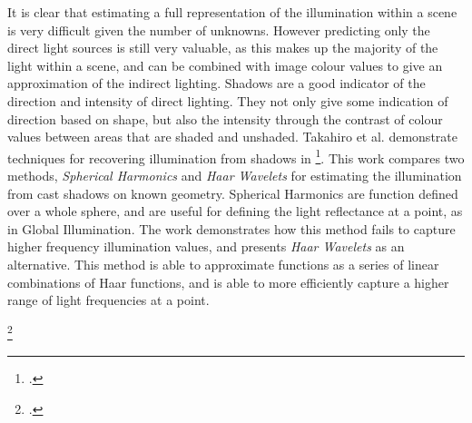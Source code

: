 \documentclass[ %
                    author={Gavin Parker},
                supervisor={Dr. Neill Campbell},
                    degree={MEng},
                     title={Deep Siamese Networks for Illumination Estimation from Stereo Images},
                  subtitle={},
                      type={research},
                      year={2018} ]{dissertation}
\begin{document}
It is clear that estimating a full representation of the illumination within a scene is very difficult given the number of unknowns. However predicting only the direct light sources is still very valuable, as this makes up the majority of the light within a scene, and can be combined with image colour values to give an approximation of the indirect lighting. Shadows are a good indicator of the direction and intensity of direct lighting. They not only give some indication of direction based on shape, but also the intensity through the contrast of colour values between areas that are shaded and unshaded. Takahiro et al. demonstrate techniques for recovering illumination from shadows in \footcite{http://ieeexplore.ieee.org/stamp/stamp.jsp?tp=&arnumber=1315013}. This work compares two methods, \textit{Spherical Harmonics} and \textit{Haar Wavelets} for estimating the illumination from cast shadows on known geometry. Spherical Harmonics are function defined over a whole sphere, and are useful for defining the light reflectance at a point, as in Global Illumination. The work demonstrates how this method fails to capture higher frequency illumination values, and presents \textit{Haar Wavelets} as an alternative. This method is able to approximate functions as a series of linear combinations of Haar functions, and is able to more efficiently capture a higher range of light frequencies at a point. 


\footcite{http://ieeexplore.ieee.org/stamp/stamp.jsp?tp=&arnumber=790313}
\end{document}
